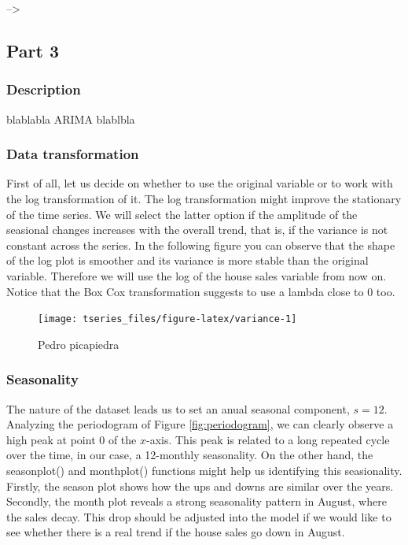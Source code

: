 \documentclass[]{article}
\begin{document}
--\textgreater{}

\subsection{Part 3}\label{part-3}

\subsubsection{Description}\label{description}

blablabla ARIMA blablbla

\subsubsection{Data transformation}\label{data-transformation}

First of all, let us decide on whether to use the original variable or
to work with the log transformation of it. The log transformation might
improve the stationary of the time series. We will select the latter
option if the amplitude of the seasional changes increases with the
overall trend, that is, if the variance is not constant across the
series. In the following figure you can observe that the shape of the
log plot is smoother and its variance is more stable than the original
variable. Therefore we will use the log of the house sales variable from
now on. Notice that the Box Cox transformation suggests to use a lambda
close to 0 too.

\begin{figure}[H]

{\centering \texttt{[image: tseries\_files/figure-latex/variance-1]} 

}

\caption{Pedro picapiedra}\label{fig:variance}
\end{figure}

\subsubsection{Seasonality}\label{seasonality}

The nature of the dataset leads us to set an anual seasonal component,
\(s=12\). Analyzing the periodogram of Figure \ref{fig:periodogram}, we
can clearly observe a high peak at point 0 of the \(x\)-axis. This peak
is related to a long repeated cycle over the time, in our case, a
12-monthly seasonality. On the other hand, the seasonplot() and
monthplot() functions might help us identifying this seasionality.
Firstly, the season plot shows how the ups and downs are similar over
the years. Secondly, the month plot reveals a strong seasonality pattern
in August, where the sales decay. This drop should be adjusted into the
model if we would like to see whether there is a real trend if the house
sales go down in August.
\end{document}
